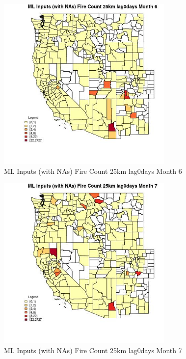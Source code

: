 \begin{figure} 
\centering  
\includegraphics[width=0.77\textwidth]{Code_Outputs/Report_ML_input_PM25_Step4_part_f_de_duplicated_aveswNAs_CountyFire_Count_25km_lag0daysmedianMonth6.jpg} 
\caption{\label{fig:Report_ML_input_PM25_Step4_part_f_de_duplicated_aveswNAsCountyFire_Count_25km_lag0daysmedianMonth6}ML Inputs (with NAs) Fire Count 25km lag0days Month 6} 
\end{figure} 
 

\begin{figure} 
\centering  
\includegraphics[width=0.77\textwidth]{Code_Outputs/Report_ML_input_PM25_Step4_part_f_de_duplicated_aveswNAs_CountyFire_Count_25km_lag0daysmedianMonth7.jpg} 
\caption{\label{fig:Report_ML_input_PM25_Step4_part_f_de_duplicated_aveswNAsCountyFire_Count_25km_lag0daysmedianMonth7}ML Inputs (with NAs) Fire Count 25km lag0days Month 7} 
\end{figure} 
 

